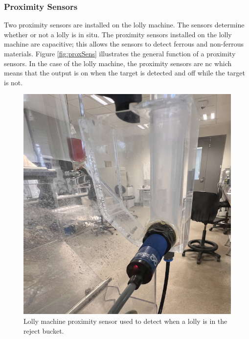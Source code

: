     \subsubsection{Proximity Sensors}
        Two proximity sensors are installed on the lolly machine. The sensors determine whether or not a lolly is in situ. The proximity sensors installed on the lolly machine are capacitive; this allows the sensors to detect ferrous and non-ferrous materials. Figure \ref{fig:proxSens} illustrates the general function of a proximity sensors. In the case of the lolly machine, the proximity sensors are \acrshort{nc} which means that the output is on when the target is detected and off while the target is not.
    \begin{figure}[H]
    \begin{minipage}{0.35\textwidth}
        \centering
            \includegraphics[scale = 0.4]{2_images/rejectProx.png}
            \caption{Lolly machine proximity sensor used to detect when a lolly is in the reject bucket.}
            \label{fig:rejectProx}
    \end{minipage}\hfill
    \begin{minipage}{0.35\textwidth}
        \centering

\end{minipage}
\end{figure}
